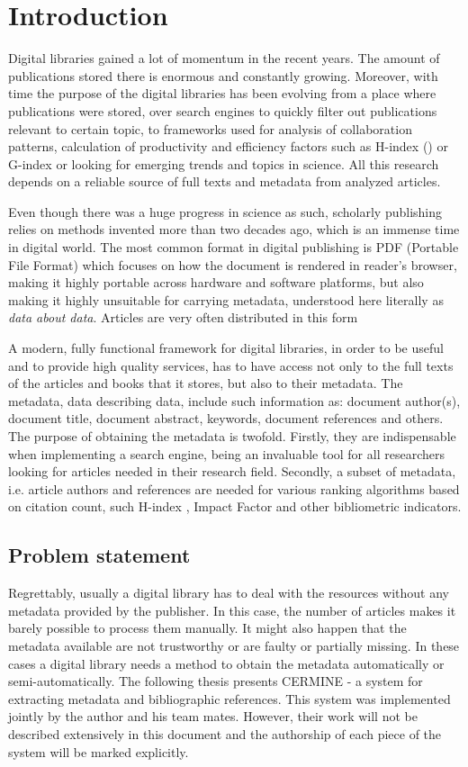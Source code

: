 \chapter{Introduction}
Digital libraries gained a lot of momentum in the recent years. The amount of publications stored there is enormous and constantly growing. Moreover, with time the purpose of the digital libraries has been evolving from a place where publications were stored, over search engines to quickly filter out publications relevant to certain topic, to frameworks used for analysis of collaboration patterns, calculation of productivity and efficiency factors such as H-index (\cite{Hirsch}) or G-index or looking for emerging trends and topics in science.
All this research depends on a reliable source of full texts and metadata from analyzed articles.

Even though there was a huge progress in science as such, scholarly publishing relies on methods invented more than two decades ago, which is an immense time in digital world. The most common format in digital publishing is PDF (Portable File Format) which focuses on how the document is rendered in reader's browser, making it highly portable across hardware and software platforms, but also making it highly unsuitable for carrying metadata, understood here literally as \textit{data about data}. Articles are very often distributed in this form

A modern, fully functional framework for digital libraries, in order to be useful and to provide high quality services, has to have access not only to the full texts of the articles and books that it stores, but also to their metadata. The metadata, data describing data, include such information as: document author(s), document title, document abstract, keywords, document references and others. The purpose of obtaining the metadata is twofold. Firstly, they are indispensable when implementing a search engine, being an invaluable tool for all researchers looking for articles needed in their research field. Secondly, a subset of metadata, i.e. article authors and references are needed for various ranking algorithms based on citation count, such H-index \cite{Hirsch}, Impact Factor and other bibliometric indicators.
\section{Problem statement}
Regrettably, usually a digital library has to deal with the resources without any metadata provided by the publisher. In this case, the number of articles makes it barely possible to process them manually. It might also happen that the metadata available are not trustworthy or are faulty or partially missing. In these cases a digital library needs a method to obtain the metadata automatically or semi-automatically. The following thesis presents CERMINE - a system for extracting metadata and bibliographic references. This system was implemented jointly by the author and his team mates. However, their work will not be described extensively in this document and the authorship of each piece of the system will be marked explicitly. 
